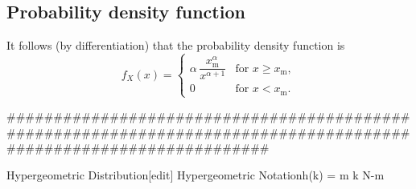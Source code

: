 \subsection{Probability density function}
It follows (by differentiation) that the probability density function is
\[
f_X(x)= \begin{cases} \alpha\,\dfrac{x_\mathrm{m}^\alpha}{x^{\alpha+1}} & \mbox{for }x \ge x_\mathrm{m}, \\[12pt] 0 & \mbox{for } x < x_\mathrm{m}. \end{cases} 
\]

##################################################################################################################

Hypergeometric Distribution[edit]
Hypergeometric
Notationh(k) = {{{m \choose k} {{N-m} }}} 







